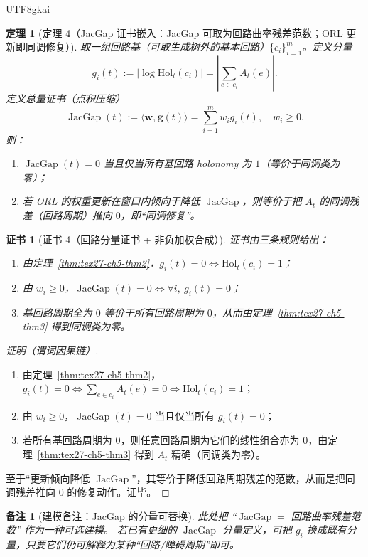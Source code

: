 \documentclass[12pt]{article}
\newtheorem{theorem}{定理}[section]
\newtheorem{remark}{备注}[section]
\newtheorem{Certificate}{证书}[section]
\newcommand{\JacGap}{\operatorname{JacGap}}
\begin{document}
\begin{CJK*}{UTF8}{gkai}
\begin{theorem}[定理 4（JacGap 证书嵌入：JacGap 可取为回路曲率残差范数；ORL 更新即同调修复）]
\label{thm:tex27-ch5-thm4}
取一组回路基（可取生成树外的基本回路）$\{c_i\}_{i=1}^m$。定义分量
\[
  g_i(t):=\big|\log\mathrm{Hol}_t(c_i)\big|
  =\left|\sum_{e\in c_i}A_t(e)\right|.
\]
定义总量证书（点积压缩）
\[
  \JacGap(t):=\langle \mathbf{w},\mathbf{g}(t)\rangle=\sum_{i=1}^m w_i g_i(t),\quad w_i\ge 0.
\]
则：
\begin{enumerate}
  \item $\JacGap(t)=0$ 当且仅当所有基回路 holonomy 为 $1$（等价于同调类为零）；
  \item 若 ORL 的权重更新在窗口内倾向于降低 $\JacGap$，则等价于把 $A_t$ 的同调残差（回路周期）推向 $0$，即“同调修复”。
\end{enumerate}
\end{theorem}

\begin{Certificate}[证书 4（回路分量证书 + 非负加权合成）]
\label{cert:tex27-ch5-thm4}
证书由三条规则给出：
\begin{enumerate}
  \item 由定理~\ref{thm:tex27-ch5-thm2}，$g_i(t)=0\iff \mathrm{Hol}_t(c_i)=1$；
  \item 由 $w_i\ge 0$，$\JacGap(t)=0\iff \forall i,\ g_i(t)=0$；
  \item 基回路周期全为 $0$ 等价于所有回路周期为 $0$，从而由定理~\ref{thm:tex27-ch5-thm3} 得到同调类为零。
\end{enumerate}
\end{Certificate}

\begin{proof}[证明（谓词因果链）]
\begin{enumerate}
  \item 由定理~\ref{thm:tex27-ch5-thm2}，$g_i(t)=0\iff \sum_{e\in c_i}A_t(e)=0\iff \mathrm{Hol}_t(c_i)=1$；
  \item 由 $w_i\ge 0$，$\JacGap(t)=0$ 当且仅当所有 $g_i(t)=0$；
  \item 若所有基回路周期为 $0$，则任意回路周期为它们的线性组合亦为 $0$，由定理~\ref{thm:tex27-ch5-thm3} 得到 $A_t$ 精确（同调类为零）。
\end{enumerate}
至于“更新倾向降低 $\JacGap$”，其等价于降低回路周期残差的范数，从而是把同调残差推向 $0$ 的修复动作。证毕。
\end{proof}

\begin{remark}[建模备注：JacGap 的分量可替换]
此处把 “$\JacGap=$ 回路曲率残差范数” 作为一种可选建模。
若已有更细的 $\JacGap$ 分量定义，可把 $g_i$ 换成既有分量，只要它们仍可解释为某种“回路/障碍周期”即可。
\end{remark}


\end{CJK*}
\end{document}
